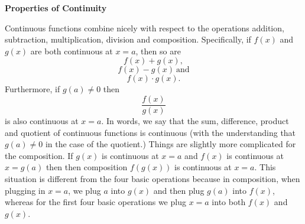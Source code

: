 \documentclass{ximera}
\begin{document}
\begin{center}
\textbf{Properties of Continuity}
\end{center}



Continuous functions combine nicely with respect to the operations addition, subtraction, multiplication, 
division and composition. Specifically, if $f(x)$ and $g(x)$ are both continuous at $x = a$, then so are
\[f(x) + g(x),\]
\[f(x) - g(x) \ \text{and}\]
\[f(x) \cdot g(x).\]
Furthermore, if $g(a) \neq 0$ then 
\[\frac{f(x)}{g(x)}\]
is also continuous at $x = a$. 
In words, we say that the sum, difference, product and quotient of continuous functions is continuous 
(with the understanding that $g(a) \neq 0$ in the case of the quotient.)
Things are slightly more complicated for the composition. If $g(x)$ is continuous at $x = a$ and $f(x)$ is 
continuous at $x = g(a)$ then then composition $f(g(x))$ is continuous at $x = a$. This situation is 
different from the four basic operations because in composition, when plugging in $x = a$, we plug $a$ 
into $g(x)$ and then plug $g(a)$ into $f(x)$,
whereas for the first four basic operations we plug $x = a$ into both $f(x)$ and $g(x)$.



 
\begin{center}
\begin{foldable}
\end{foldable}
\end{center}
\end{document}
